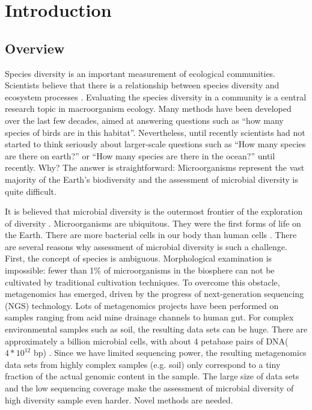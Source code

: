 \chapter{Introduction}

\section{Overview} Species diversity is an important measurement of ecological
communities. Scientists believe that there is a relationship between species
diversity and ecosystem processes \cite{Loreau:2001aa}. Evaluating the species
diversity in a community is a central research topic in macroorganism ecology.
Many methods have been developed over the last few decades, aimed at answering
questions such as ``how many species of birds are in this habitat''.
Nevertheless, until recently scientists had not started to think seriously
about larger-scale questions such as ``How many species are there on earth?''
\cite{May:1988aa} or ``How many species are there in the ocean?''
\cite{Mora:2011aa} until recently. Why? The answer is straightforward:
Microorganisms represent the vast majority of the Earth's biodiversity and the
assessment of microbial diversity is quite difficult.

It is believed that microbial diversity is the outermost frontier of the
exploration of diversity \cite{magurran2011biological}. Microorganisms are
ubiquitous. They were the first forms of life on the Earth. There are more
bacterial cells in our body than human cells \cite{Savage:1977aa}. 
There are several reasons why assessment of microbial diversity is such a
challenge. First, the concept of species is ambiguous. Morphological
examination is impossible: fewer than 1\% of microorganisms  in the biosphere
can not be cultivated by traditional cultivation
techniques\cite{Curtis:2002aa}. To overcome this obstacle, metagenomics has
emerged, driven by the progress of next-generation sequencing (NGS) technology.
Lots of metagenomics projects have been performed on samples ranging from acid
mine drainage channels to human gut. For complex environmental samples such as
soil, the resulting data sets can be huge. There are approximately a billion
microbial cells, with about 4 petabase pairs of DNA($4*{10}^{12}$ bp)
\cite{Zarraonaindia:2013aa}. Since we have limited sequencing power, the
resulting metagenomics data sets from highly complex samples (e.g. soil) only
correspond to a tiny fraction of the actual genomic content in the sample. The
large size of data sets and the low sequencing coverage make the assessment of
microbial diversity of high diversity sample even harder. Novel methods are
needed.


